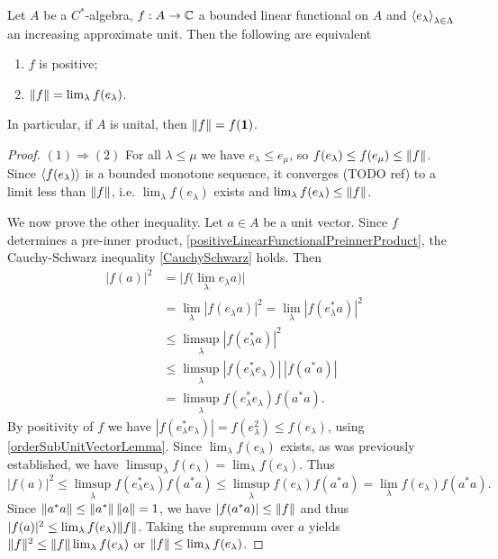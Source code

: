 \begin{proposition} \label{positiveFunctionalNormValueAtUnit}
Let $A$ be a $C^*$-algebra, $f: A\to \mathbb{C}$ a bounded linear functional on $A$ and $\left\langle e_\lambda \right\rangle_{\lambda\in \Lambda}$ an increasing approximate unit. Then the following are equivalent
\begin{enumerate}
\item $f$ is positive;
\item $\lVert f\rVert = \lim_\lambda f(e_\lambda)$.
\end{enumerate}
In particular, if $A$ is unital, then $\lVert f\rVert = f(\boldsymbol{\mathrm{1}})$.
\end{proposition}
\begin{proof}
$(1) \Rightarrow (2)$  For all $\lambda \leq \mu$ we have $e_\lambda \leq e_\mu$, so $f(e_\lambda) \leq f(e_\mu) \leq \lVert f\rVert$. Since $\left\langle f(e_\lambda) \right\rangle$ is a bounded monotone sequence, it converges (TODO ref) to a limit less than $\lVert f\rVert$, i.e. $\lim_\lambda f(e_\lambda)$ exists and $\lim_\lambda f(e_\lambda)\leq \lVert f\rVert$.

We now prove the other inequality. Let $a\in A$ be a unit vector. Since $f$ determines a pre-inner product, \ref{positiveLinearFunctionalPreinnerProduct}, the Cauchy-Schwarz inequality \ref{CauchySchwarz} holds. Then
\begin{align*}
|f(a)|^2 &= \big|f\big(\lim_\lambda e_\lambda a\big)\big| \\
&= \lim_\lambda |f(e_\lambda a)|^2 = \lim_\lambda |f(e_\lambda^* a)|^2 \\
&\leq \limsup_\lambda |f(e_\lambda^* a)|^2 \\
&\leq \limsup_\lambda |f(e_\lambda^*e_\lambda)|\, |f(a^*a)| \\
&= \limsup_\lambda f(e_\lambda^*e_\lambda)f(a^*a).
\end{align*}
By positivity of $f$ we have $|f(e_\lambda^*e_\lambda)| = f(e_\lambda^2) \leq f(e_\lambda)$, using \ref{orderSubUnitVectorLemma}. Since $\lim_\lambda f(e_\lambda)$ exists, as was previously established, we have $\limsup_\lambda f(e_\lambda) = \lim_\lambda f(e_\lambda)$. Thus
\[ |f(a)|^2 \leq \limsup_\lambda f(e_\lambda^*e_\lambda)f(a^*a) \leq \limsup_\lambda f(e_\lambda) f(a^*a) = \lim_\lambda f(e_\lambda) f(a^*a). \]
Since $\lVert a^*a\rVert \leq \lVert a^*\rVert\,\lVert a\rVert = 1$, we have $|f(a^*a)|\leq \lVert f\rVert$ and thus $|f(a)|^2 \leq \lim_\lambda f(e_\lambda) \lVert f\rVert$. Taking the supremum over $a$ yields $\lVert f\rVert^2 \leq \lVert f\rVert\lim_\lambda f(e_\lambda)$ or $\lVert f\rVert \leq \lim_\lambda f(e_\lambda)$.


\end{proof}
